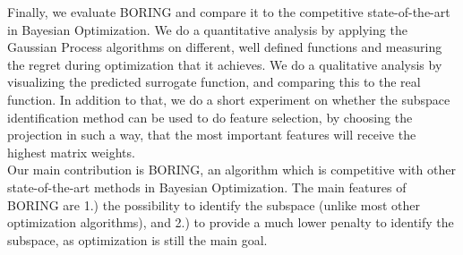 Finally, we evaluate BORING and compare it to the competitive state-of-the-art in Bayesian Optimization.
We do a quantitative analysis by applying the Gaussian Process algorithms on different, well defined functions and measuring the regret during optimization that it achieves.
We do a qualitative analysis by visualizing the predicted surrogate function, and comparing this to the real function.
In addition to that, we do a short experiment on whether the subspace identification method can be used to do feature selection, by choosing the projection in such a way, that the most important features will receive the highest matrix weights. \\

Our main contribution is BORING, an algorithm which is competitive with other state-of-the-art methods in Bayesian Optimization.
The main features of BORING are 1.) the possibility to identify the subspace (unlike most other optimization algorithms), and 2.) to provide a much lower penalty to identify the subspace, as optimization is still the main goal.


\newpage
\vspace*{\fill}
